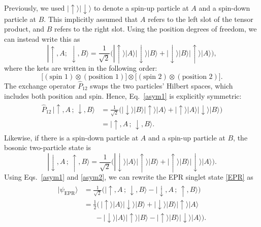 \documentclass[prx,12pt]{revtex4-2}
\begin{document}
Previously, we used $|\!\uparrow\rangle |\!\downarrow\rangle$ to
denote a spin-up particle at $A$ and a spin-down particle at $B$.
This implicitly assumed that $A$ refers to the left slot of the tensor
product, and $B$ refers to the right slot.  Using the position degrees
of freedom, we can instead write this as
\begin{equation}
  |\uparrow, A;\; \downarrow, B\rangle = \frac{1}{\sqrt{2}}
  \Big(|\!\uparrow\rangle|A\rangle |\!\downarrow\rangle|B\rangle
  + |\!\downarrow\rangle|B\rangle |\!\uparrow\rangle|A\rangle \Big),
  \label{asym1}
\end{equation}
where the kets are written in the following order:
\begin{equation}
  \Big[
    (\textrm{spin 1}) \otimes (\textrm{position 1}) \Big]
  \otimes
  \Big[
    (\textrm{spin 2}) \otimes (\textrm{position 2}) \Big].
  \label{order1}
\end{equation}
The exchange operator $\hat{P}_{12}$ swaps the two particles' Hilbert
spaces, which includes both position and spin.  Hence,
Eq.~\eqref{asym1} is explicitly symmetric:
\begin{align}
  \begin{aligned}
  \hat{P}_{12} \, |\uparrow, A\,;\, \downarrow, B\rangle &= \frac{1}{\sqrt{2}}
  \Big(|\!\downarrow\rangle|B\rangle |\!\uparrow\rangle|A\rangle
  + |\!\uparrow\rangle|A\rangle |\!\downarrow\rangle|B\rangle \Big) \\
  &= |\uparrow, A\,;\, \downarrow, B\rangle.
  \end{aligned}
\end{align}
Likewise, if there is a spin-down particle at $A$ and a spin-up
particle at $B$, the bosonic two-particle state is
\begin{equation}
  |\downarrow, A\,;\, \uparrow, B\rangle = \frac{1}{\sqrt{2}}
  \Big(|\!\downarrow\rangle|A\rangle |\!\uparrow\rangle|B\rangle
  + |\!\uparrow\rangle|B\rangle |\!\downarrow\rangle|A\rangle \Big).
  \label{asym2}
\end{equation}
Using Eqs.~\eqref{asym1} and \eqref{asym2}, we can rewrite the EPR
singlet state \eqref{EPR} as
\begin{align}
  \begin{aligned}
    |\psi_{\mathrm{EPR}}\rangle &= \frac{1}{\sqrt{2}} \Big(
    |\!\uparrow, A\,;\, \downarrow, B\rangle - |\downarrow, A\,;\, \uparrow, B\rangle \Big)\\
    &= \frac{1}{2} \Big(\,
    |\!\uparrow\rangle|A\rangle |\!\downarrow\rangle|B\rangle
    + |\!\downarrow\rangle|B\rangle |\!\uparrow\rangle|A\rangle \\
    &\quad\;\;- |\!\downarrow\rangle|A\rangle |\!\uparrow\rangle|B\rangle
    - |\!\uparrow\rangle|B\rangle |\!\downarrow\rangle|A\rangle \Big).
    \label{epr1}
  \end{aligned}
\end{align}
\end{document}
